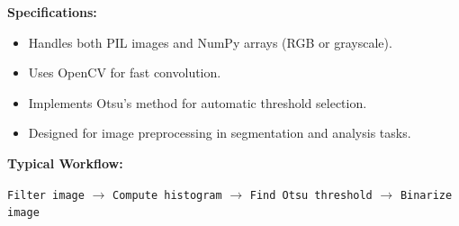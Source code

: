 \documentclass[12pt]{article}
\begin{document}
\vspace{0.3cm}
\textbf{Specifications:}
\begin{itemize}[left=0pt]
    \item Handles both PIL images and NumPy arrays (RGB or grayscale).
    \item Uses OpenCV for fast convolution.
    \item Implements Otsu's method for automatic threshold selection.
    \item Designed for image preprocessing in segmentation and analysis tasks.
\end{itemize}

\vspace{0.3cm}
\textbf{Typical Workflow:}
\begin{center}
    \texttt{Filter image} $\rightarrow$ \texttt{Compute histogram} $\rightarrow$ \texttt{Find Otsu threshold} $\rightarrow$ \texttt{Binarize image}
\end{center}
\end{document}
